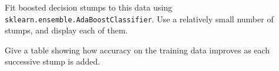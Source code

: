 \documentclass{article}
\begin{document}
\begin{probset}
\begin{progprob}
\begin{subprobset}
\begin{subprob}
\begin{soln}
        \end{soln}
    \end{subprob}

    \begin{subprob}
        Fit boosted decision stumps to this data using \texttt{sklearn.ensemble.AdaBoostClassifier}. Use a relatively small number of stumps, and display each of them.

        \begin{soln}

        \end{soln}
    \end{subprob}

    \begin{subprob}
        Give a table showing how accuracy on the training data improves as each successive stump is added.

        \begin{soln}

        \end{soln}
    \end{subprob}
    \end{subprobset}
\end{progprob}
\end{probset}
\end{document}
